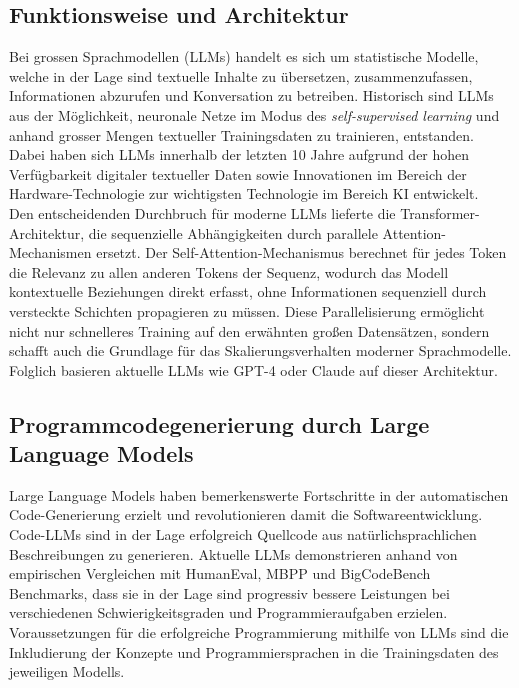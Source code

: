 \subsection{Funktionsweise und Architektur}
Bei grossen Sprachmodellen (LLMs) handelt es sich um statistische Modelle,
welche in der Lage sind textuelle Inhalte zu übersetzen, zusammenzufassen,
Informationen abzurufen und Konversation zu betreiben. Historisch sind LLMs aus
der Möglichkeit, neuronale Netze im Modus des \textit{self-supervised learning}
und anhand grosser Mengen textueller Trainingsdaten zu trainieren, entstanden.
Dabei haben sich LLMs innerhalb der letzten 10 Jahre aufgrund der
hohen Verfügbarkeit digitaler
textueller Daten sowie Innovationen im Bereich der Hardware-Technologie zur
wichtigsten Technologie im Bereich KI entwickelt. \\

\noindent Den entscheidenden Durchbruch für moderne LLMs lieferte die
Transformer-Architektur, die sequenzielle Abhängigkeiten durch parallele
Attention-Mechanismen ersetzt. Der
Self-Attention-Mechanismus berechnet für jedes Token die Relevanz zu allen
anderen Tokens der Sequenz, wodurch das Modell kontextuelle Beziehungen direkt
erfasst, ohne Informationen sequenziell durch versteckte Schichten propagieren
zu müssen. Diese Parallelisierung ermöglicht nicht nur schnelleres Training auf
den erwähnten großen Datensätzen, sondern schafft auch die Grundlage für das
Skalierungsverhalten moderner Sprachmodelle. Folglich basieren aktuelle LLMs wie
GPT-4 oder Claude auf dieser Architektur.

\subsection{Programmcodegenerierung durch Large Language Models}%
Large Language Models haben bemerkenswerte Fortschritte in der automatischen
Code-Generierung erzielt und revolutionieren damit die Softwareentwicklung.
Code-LLMs sind in der Lage erfolgreich Quellcode aus natürlichsprachlichen
Beschreibungen zu generieren. Aktuelle LLMs demonstrieren anhand von
empirischen Vergleichen mit HumanEval, MBPP und BigCodeBench Benchmarks, dass
sie in der Lage sind progressiv bessere Leistungen bei verschiedenen
Schwierigkeitsgraden und Programmieraufgaben erzielen. 
Voraussetzungen für die erfolgreiche Programmierung mithilfe von LLMs sind die
Inkludierung der Konzepte und Programmiersprachen in die Trainingsdaten des
jeweiligen Modells.\\

